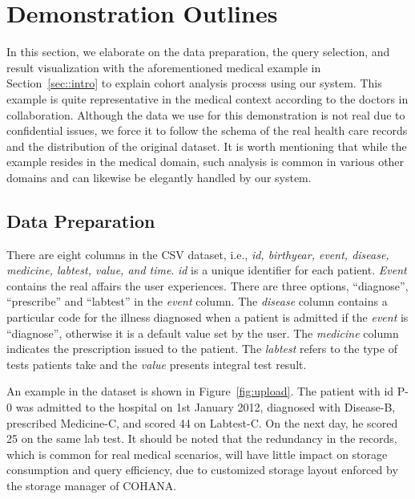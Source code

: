\section{Demonstration Outlines}

In this section, we elaborate on the data preparation, the query selection, and result visualization with the aforementioned medical example in Section~\ref{sec::intro} to explain cohort analysis process using our system. This example is quite representative in the medical context according to the doctors in collaboration.
Although the data we use for this demonstration is not real due to confidential issues, we force it to follow the schema of the real health care records and the distribution of the original dataset.
It is worth mentioning that while the example resides in the medical domain, such analysis is common in various other domains and can likewise be elegantly handled by our system.

\subsection{Data Preparation}
There are eight columns in the CSV dataset, i.e., \emph{id, birthyear, event, disease, medicine, labtest, value, and time}. \emph{id} is a unique identifier for each patient.
\emph{Event} contains the real affairs the user experiences.
There are three options, ``diagnose'', ``prescribe'' and ``labtest'' in the \emph{event} column.
The \emph{disease} column contains a particular code for the illness diagnosed when a patient is admitted if the \emph{event} is ``diagnose'', otherwise it is a default value set by the user.
The \emph{medicine} column indicates the prescription issued to the patient. %
The \emph{labtest} refers to the type of tests patients take and the \emph{value} presents integral test result. 

An example in the dataset is shown in Figure~\ref{fig:upload}. The patient with id P-0 was admitted to the hospital on 1st January 2012, diagnosed with Disease-B, prescribed Medicine-C, and scored 44 on Labtest-C. On the next day, he scored 25 on the same lab test. 
It should be noted that the redundancy in the records, which is common for real medical scenarios, will have little impact on storage consumption and query efficiency, due to customized storage layout enforced by the storage manager of COHANA.

